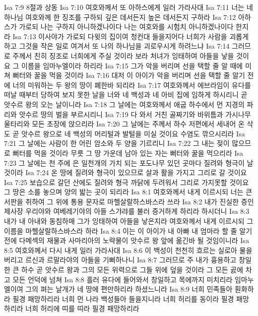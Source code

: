 Isa 7:9  8절과 상동
Isa 7:10  여호와께서 또 아하스에게 일러 가라사대
Isa 7:11  너는 네 하나님 여호와께 한 징조를 구하되 깊은 데서든지 높은 데서든지 구하라
Isa 7:12  아하스가 가로되 나는 구하지 아니하겠나이다 나는 여호와를 시험치 아니하겠나이다 한지라
Isa 7:13  이사야가 가로되 다윗의 집이여 청컨대 들을지어다 너희가 사람을 괴롭게 하고 그것을 작은 일로 여겨서 또 나의 하나님을 괴로우시게 하려느냐
Isa 7:14  그러므로 주께서 친히 징조로 너희에게 주실 것이라 보라 처녀가 잉태하여 아들을 낳을 것이요 그 이름을 임마누엘이라 하리라
Isa 7:15  그가 악을 버리며 선을 택할 줄 알 때에 미쳐 뻐터와 꿀을 먹을 것이라
Isa 7:16  대저 이 아이가 악을 버리며 선을 택할 줄 알기 전에 너의 미워하는 두 왕의 땅이 폐한바 되리라
Isa 7:17  여호와께서 에브라임이 유다를 떠날 때부터 당하여 보지 못한 날을 너와 네 백성과 네 아비 집에 임하게 하시리니 곧 앗수르 왕의 오는 날이니라
Isa 7:18  그 날에는 여호와께서 애굽 하수에서 먼 지경의 파리와 앗수르 땅의 벌을 부르시리니
Isa 7:19  다 와서 거친 골짜기와 바위틈과 가시나무 울타리와 모든 초장에 앉으리라
Isa 7:20  그 날에는 주께서 하수 저편에서 세내어 온 삭도 곧 앗수르 왕으로 네 백성의 머리털과 발털을 미실 것이요 수염도 깎으시리라
Isa 7:21  그 날에는 사람이 한 어린 암소와 두 양을 기르리니
Isa 7:22  그 내는 젖이 많으므로 뻐터를 먹을 것이라 무릇 그 땅 가운데 남아 있는 자는 뻐터와 꿀을 먹으리라
Isa 7:23  그 날에는 천 주에 은 일천개의 가치 되는 포도나무 있던 곳마다 질려와 형극이 날 것이라
Isa 7:24  온 땅에 질려와 형극이 있으므로 살과 활을 가지고 그리로 갈 것이요
Isa 7:25  보습으로 갈던 산에도 질려와 형극 까닭에 두려워서 그리로 가지못할 것이요 그 땅은 소를 놓으며 양의 밟는 곳이 되리라
Isa 8:1  여호와께서 내게 이르시되 너는 큰 서판을 취하여 그 위에 통용 문자로 마헬살랄하스바스라 쓰라
Isa 8:2  내가 진실한 증인 제사장 우리야와 여베레기야의 아들 스갸랴를 불러 증거하게 하리라 하시더니
Isa 8:3  내가 내 아내와 동침하매 그가 잉태하여 아들을 낳은지라 여호와께서 내게 이르시되 그 이름을 마헬살랄하스바스라 하라
Isa 8:4  이는 이 아이가 내 아빠 내 엄마라 할 줄 알기 전에 다메섹의 재물과 사마리아의 노략물이 앗수르 왕 앞에 옮긴바 될 것임이니라
Isa 8:5  여호와께서 다시 내게 일러 가라사대
Isa 8:6  이 백성이 천천히 흐르는 실로아 물을 버리고 르신과 르말라야의 아들을 기뻐하나니
Isa 8:7  그러므로 주 내가 흉용하고 창일한 큰 하수 곧 앗수르 왕과 그의 모든 위력으로 그들 위에 덮을 것이라 그 모든 곬에 차고 모든 언덕에 넘쳐
Isa 8:8  흘러 유다에 들어와서 창일하고 목에까지 미치리라 임마누엘이여 그의 펴는 날개가 네 땅에 편만하리라 하셨느니라
Isa 8:9  너희 민족들아 훤화하라 필경 패망하리라 너희 먼 나라 백성들아 들을지니라 너희 허리를 동이라 필경 패망하리라 너희 허리에 띠를 띠라 필경 패망하리라
